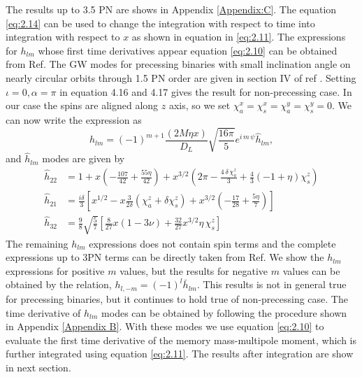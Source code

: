 \documentclass[twocolumn,showpacs,aps,prd,nobibnotes,floatfix]{revtex4-1}
\begin{document}
The results up to 3.5 PN are shows in Appendix \ref{Appendix:C}.
The equation \ref{eq:2.14} can be used to change the integration with respect to time into integration with respect to $x$ as shown in equation in \ref{eq:2.11}. The expressions for $h_{lm}$ whose first time derivatives appear equation \ref{eq:2.10} can be obtained from Ref\cite{Arun2009}. The GW modes for precessing binaries with small inclination angle on nearly circular orbits through 1.5 PN order are given in section IV of ref \cite{Arun2009}. Setting $\iota = 0, \alpha = \pi$ in equation 4.16 and 4.17 gives the result for non-precessing case. In our case the spins are aligned along $z$ axis, so we set $\chi_a^x=\chi_s^x=\chi_a^y=\chi_s^y=0$. We can now write the expression as 
\begin{equation}
h_{lm} = (-1)^{m+1}\frac{(2M\eta x)}{D_L}\sqrt{\frac{16\pi}{5}}e^{\mathit{i}\,m\,\psi}\hat{h}_{lm},
\end{equation}
and $\hat{h}_{lm}$ modes are given by 
\begin{subequations}
	\begin{align}\label{eq:2.15}
	\hat{h}_{22} &= 1 + x\left(-\frac{107}{42} + \frac{55\eta}{42}\right) + x^{3/2}\left(2\pi - \frac{4\,\delta\,\chi^{z}_{a}}{3} + \frac{4}{3}\left(-1+\eta\right)\chi^z_s\right)\\
	\hat{h}_{21} &= \frac{\mathit{i}\delta}{3}\left[x^{1/2} - x\frac{3}{2\delta}\left(\chi^{z}_{a} + \delta\chi^{z}_{s}\right) + x^{3/2}\left(-\frac{17}{28} + \frac{5\eta}{7}\right)\right]\\
	\hat{h}_{32} &= \frac{9}{8}\sqrt{\frac{5}{7}}\left[\frac{8}{27}x\left(1-3\nu\right) + \frac{32}{27}x^{3/2}\eta\,\chi^z_s\right]
	\end{align}
\end{subequations}
The remaining $h_{lm}$ expressions does not contain spin terms and the complete expressions up to 3PN terms can be directly taken from Ref.\cite{Blanchet_Iyer2008}
 We show the $h_{lm}$ expressions for positive $m$ values, but the results for negative $m$ values can be obtained by the relation, $h_{l, -m} = (-1)^l \bar{h}_{lm}$. This results is not in general true for precessing binaries, but it continues to hold true of non-precessing case. The time derivative of $h_{lm}$ modes can be obtained by following the procedure shown in Appendix \ref{Appendix B}. With these modes we use equation \ref{eq:2.10} to evaluate the first time derivative of the memory mass-multipole moment, which is further integrated using equation \ref{eq:2.11}. The results after integration are show in next section.
\end{document}
